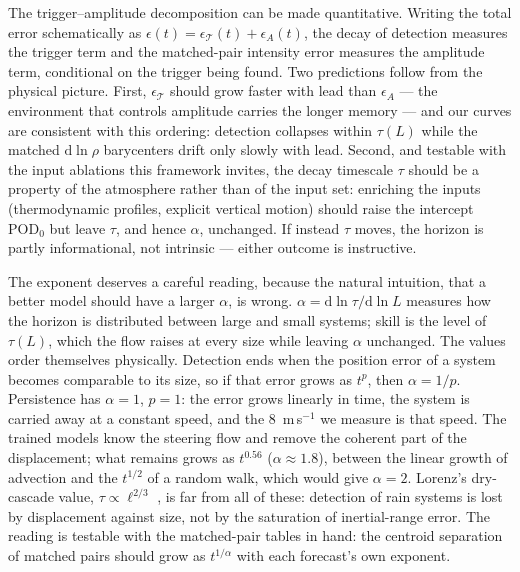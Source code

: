 \documentclass[draft]{agujournal2019}
\begin{document}
The trigger--amplitude decomposition can be made quantitative. Writing the
total error schematically as
$\epsilon(t) = \epsilon_{\mathcal{T}}(t) + \epsilon_A(t)$, the decay of
detection measures the trigger term and the matched-pair intensity error
measures the amplitude term, conditional on the trigger being found. Two
predictions follow from the physical picture. First,
$\epsilon_{\mathcal{T}}$ should grow faster with lead than $\epsilon_A$ ---
the environment that controls amplitude carries the longer memory --- and
our curves are consistent with this ordering: detection collapses within
$\tau(L)$ while the matched $\mathrm{d}\ln\rho$ barycenters drift only
slowly with lead. Second, and testable with the input ablations this
framework invites, the decay timescale $\tau$ should be a property of the
atmosphere rather than of the input set: enriching the inputs (thermodynamic
profiles, explicit vertical motion) should raise the intercept
$\mathrm{POD}_0$ but leave $\tau$, and hence $\alpha$, unchanged. If instead
$\tau$ moves, the horizon is partly informational, not intrinsic --- either
outcome is instructive.

The exponent deserves a careful reading, because the natural intuition,
that a better model should have a larger $\alpha$, is wrong.
$\alpha = \mathrm{d}\ln\tau / \mathrm{d}\ln L$ measures how the horizon is
distributed between large and small systems; skill is the level of
$\tau(L)$, which the flow raises at every size while leaving $\alpha$
unchanged. The values order themselves physically. Detection ends when the
position error of a system becomes comparable to its size, so if that
error grows as $t^{p}$, then $\alpha = 1/p$. Persistence has $\alpha = 1$,
$p = 1$: the error grows linearly in time, the system is carried away at a
constant speed, and the $8$~m\,s$^{-1}$ we measure is that speed. The
trained models know the steering flow and remove the coherent part of the
displacement; what remains grows as $t^{0.56}$ ($\alpha \approx 1.8$),
between the linear growth of advection and the $t^{1/2}$ of a random walk,
which would give $\alpha = 2$. Lorenz's dry-cascade value,
$\tau \propto \ell^{2/3}$ \cite{lorenz1969}, is far from all of these:
detection of rain systems is lost by displacement against size, not by the
saturation of inertial-range error. The reading is testable with the
matched-pair tables in hand: the centroid separation of matched pairs
should grow as $t^{1/\alpha}$ with each forecast's own exponent.
\end{document}
